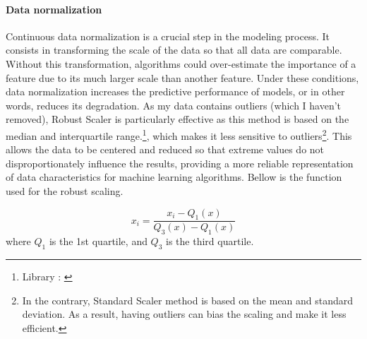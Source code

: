 \documentclass[12pt]{article}
\begin{document}
\paragraph{Data normalization} Continuous data normalization is a crucial step in the modeling process. It consists in transforming the scale of the data so that all data are comparable. Without this transformation, algorithms could over-estimate the importance of a feature due to its much larger scale than another feature. Under these conditions, data normalization increases the predictive performance of models, or in other words, reduces its degradation.
As my data contains outliers (which I haven't removed), Robust Scaler is particularly effective as this method is based on the median and interquartile range.\footnote{Library : \cite{RobustScaler}}, which makes it less sensitive to outliers\footnote{In the contrary, Standard Scaler method is based on the mean and standard deviation. As a result, having outliers can bias the scaling and make it less efficient.}. 
This allows the data to be centered and reduced so that extreme values do not disproportionately influence the results, providing a more reliable representation of data characteristics for machine learning algorithms. Bellow is the function used for the robust scaling.

\begin{equation}
x_i = \frac{x_i - Q_1(x)}{Q_3(x) - Q_1(x)}    
\end{equation}
where $Q_1$ is the 1st quartile, and $Q_3$ is the third quartile.
\end{document}
